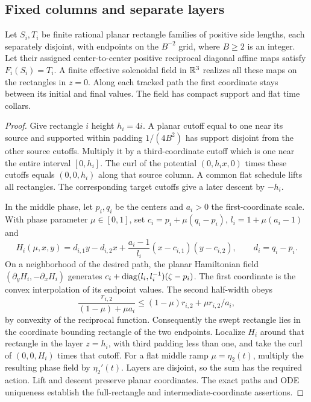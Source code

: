 \subsection{Fixed columns and separate layers}\label{bc:columns-section}
\begin{proposition}\label{bc:columns}
Let $S_i,T_i$ be finite rational planar rectangle families of positive side
lengths, each separately disjoint, with endpoints on the $B^{-2}$ grid,
where $B\ge2$ is an integer.
Let their assigned center-to-center positive reciprocal diagonal affine
maps satisfy $F_i(S_i)=T_i$. A finite effective
solenoidal field in $\mathbb R^3$ realizes all these maps on the rectangles in
$z=0$. Along each tracked path the first coordinate stays between its
initial and final values. The field has compact support and flat time
collars.
\end{proposition}
\begin{proof}\label{bc:columns-proof}
Give rectangle $i$ height $h_i=4i$. A planar cutoff equal to one near
its source and supported within padding $1/(4B^2)$ has support disjoint
from the other source cutoffs. Multiply it by a third-coordinate cutoff
which is one near the entire interval $[0,h_i]$. The curl of the potential
$(0,h_i x,0)$ times these cutoffs equals $(0,0,h_i)$ along that source
column. A common flat schedule lifts all rectangles. The corresponding
target cutoffs give a later descent by $-h_i$.

In the middle phase, let $p_i,q_i$ be the centers and $a_i>0$ the
first-coordinate scale. With phase parameter $\mu\in[0,1]$, set
$c_i=p_i+\mu(q_i-p_i)$, $l_i=1+\mu(a_i-1)$ and
\[
 H_i(\mu,x,y)=d_{i,1}y-d_{i,2}x+
       \frac{a_i-1}{l_i}(x-c_{i,1})(y-c_{i,2}),
 \qquad d_i=q_i-p_i.
\]
On a neighborhood of the desired path, the planar Hamiltonian field
$(\partial_yH_i,-\partial_xH_i)$ generates
$c_i+\operatorname{diag}(l_i,l_i^{-1})(\zeta-p_i)$.
The first coordinate is the convex interpolation of its endpoint values.
The second half-width obeys
\[
 \frac{r_{i,2}}{(1-\mu)+\mu a_i}
 \le (1-\mu)r_{i,2}+\mu r_{i,2}/a_i,
\]
by convexity of the reciprocal function. Consequently the swept rectangle
lies in the coordinate bounding rectangle of the two endpoints. Localize
$H_i$ around that rectangle in the layer $z=h_i$, with third padding less
than one, and take the curl of $(0,0,H_i)$ times that cutoff. For a
flat middle ramp $\mu=\eta_2(t)$, multiply the resulting phase field by
$\eta_2'(t)$. Layers are disjoint, so the sum has the required action. Lift and descent preserve
planar coordinates. The exact paths and ODE uniqueness establish the
full-rectangle and intermediate-coordinate assertions.
\end{proof}

